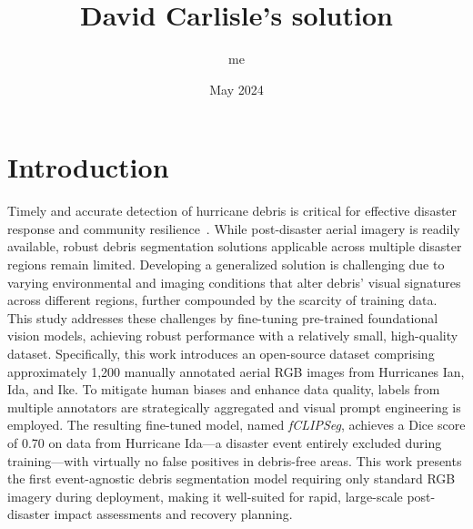 \documentclass{article}
\title{David Carlisle's solution}
\author{me}
\date{May 2024}
\begin{document}
\maketitle
\section{Introduction}
Timely and accurate detection of hurricane debris is critical for effective disaster response and community resilience~\cite{Hirt1974}. While post-disaster aerial imagery is readily available, robust debris segmentation solutions applicable across multiple disaster regions remain limited. Developing a generalized solution is challenging due to varying environmental and imaging conditions that alter debris' visual signatures across different regions, further compounded by the scarcity of training data. This study addresses these challenges by fine-tuning pre-trained foundational vision models, achieving robust performance with a relatively small, high-quality dataset. Specifically, this work introduces an open-source dataset comprising approximately 1,200 manually annotated aerial RGB images from Hurricanes Ian, Ida, and Ike. To mitigate human biases and enhance data quality, labels from multiple annotators are strategically aggregated and visual prompt engineering is employed. The resulting fine-tuned model, named \emph{fCLIPSeg}, achieves a Dice score of 0.70 on data from Hurricane Ida---a disaster event entirely excluded during training---with virtually no false positives in debris-free areas. This work presents the first event-agnostic debris segmentation model requiring only standard RGB imagery during deployment, making it well-suited for rapid, large-scale post-disaster impact assessments and recovery planning.



\end{document}
